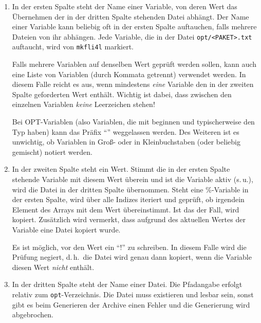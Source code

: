     \begin{enumerate}
    \item
        In der ersten Spalte steht der Name einer Variable, von
        deren Wert das Übernehmen der in der dritten Spalte stehenden
        Datei abhängt. Der Name einer Variable kann beliebig oft in
        der ersten Spalte auftauchen, falls mehrere Dateien von ihr
        abhängen. Jede Variable, die in der Datei \texttt{opt/<PAKET>.txt}
        auftaucht, wird von \texttt{mkfli4l} markiert.

        Falls mehrere Variablen auf denselben Wert geprüft werden sollen, kann
        auch eine Liste von Variablen (durch Kommata getrennt) verwendet werden.
        In diesem Falle reicht es aus, wenn mindestens \emph{eine} Variable
        den in der zweiten Spalte geforderten Wert enthält. Wichtig ist dabei,
        dass zwischen den einzelnen Variablen \emph{keine} Leerzeichen stehen!

        Bei OPT-Variablen (also Variablen, die mit  beginnen und
        typischerweise den Typ  haben) kann das Präfix
        "`"' weggelassen werden. Des Weiteren ist es unwichtig, ob
        Variablen in Groß- oder in Kleinbuchstaben (oder beliebig gemischt)
        notiert werden.

      \item In der zweiten Spalte steht ein Wert. Stimmt die in der
        ersten Spalte stehende Variable mit diesem Wert überein und
        ist die Variable aktiv (s.\,u.), wird die
        Datei in der dritten Spalte übernommen. Steht eine \%-Variable
        in der ersten Spalte, wird über alle Indizes iteriert und
        geprüft, ob irgendein Element des Arrays mit dem Wert übereinstimmt.
        Ist das der Fall, wird kopiert. Zusätzlich wird vermerkt, dass
        aufgrund des aktuellen Wertes der Variable eine Datei kopiert
        wurde.

        Es ist möglich, vor den Wert ein "`!"' zu schreiben. In diesem Falle
        wird die Prüfung negiert, d.\,h.\ die Datei wird genau dann kopiert,
        wenn die Variable diesen Wert \emph{nicht} enthält.

      \item  In der dritten Spalte steht der Name einer Datei. Die
        Pfadangabe erfolgt relativ zum \texttt{opt}-Verzeichnis. Die Datei muss
        existieren und lesbar sein, sonst gibt es beim Generieren der
        Archive einen Fehler und die Generierung wird abgebrochen.


\end{enumerate}
